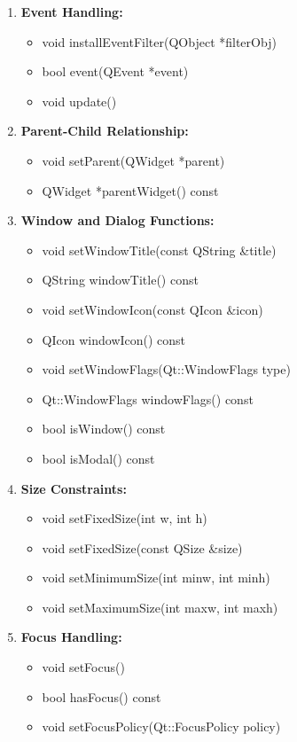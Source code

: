 \documentclass{report}
\begin{document}
\begin{enumerate}
        \item \textbf{Event Handling:}
        \begin{itemize}
            \item void installEventFilter(QObject *filterObj)
            \item bool event(QEvent *event)
            \item void update()
        \end{itemize}

        \item \textbf{Parent-Child Relationship:}
        \begin{itemize}
            \item void setParent(QWidget *parent)
            \item QWidget *parentWidget() const
        \end{itemize}

        \item \textbf{Window and Dialog Functions:}
        \begin{itemize}
            \item void setWindowTitle(const QString \&title)
            \item QString windowTitle() const
            \item void setWindowIcon(const QIcon \&icon)
            \item QIcon windowIcon() const
            \item void setWindowFlags(Qt::WindowFlags type)
            \item Qt::WindowFlags windowFlags() const
            \item bool isWindow() const
            \item bool isModal() const
        \end{itemize}

        \item \textbf{Size Constraints:}
        \begin{itemize}
            \item void setFixedSize(int w, int h)
            \item void setFixedSize(const QSize \&size)
            \item void setMinimumSize(int minw, int minh)
            \item void setMaximumSize(int maxw, int maxh)
        \end{itemize}

        \item \textbf{Focus Handling:}
        \begin{itemize}
            \item void setFocus()
            \item bool hasFocus() const
            \item void setFocusPolicy(Qt::FocusPolicy policy)
        \end{itemize}
    \end{enumerate}
\end{document}
